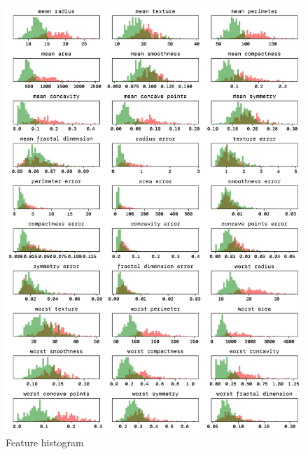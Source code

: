 \documentclass[twoside,11pt]{report}
\begin{document}
\begin{figure}
    \begin{center}
        \includegraphics[width=\textwidth]{../runsAndFigures/feature_histogram.png}
    \end{center}
    \caption{Feature histogram}\label{fig:feature_histogram}
\end{figure}
\end{document}
